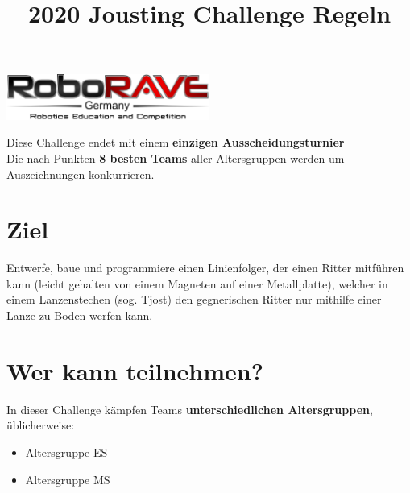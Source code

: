 \documentclass[a4paper,12pt]{article}
\begin{document}
\title{2020 Jousting Challenge Regeln}
\makeatletter
\let\inserttitle\@title
\makeatother
\begin{center}
\includegraphics[width=0.5\textwidth]{logo.png}

\huge                      %
\bfseries                   %
\inserttitle
\end{center}
\begin{center}
Diese Challenge endet mit einem \textbf{einzigen Ausscheidungsturnier}
\\
Die nach Punkten \textbf{8 besten Teams} aller Altersgruppen werden um
Auszeichnungen konkurrieren.
\end{center}
\section{Ziel}
Entwerfe, baue und programmiere einen Linienfolger, der einen Ritter mitführen
kann (leicht gehalten von einem Magneten auf einer Metallplatte), welcher in
einem Lanzenstechen (sog. Tjost) den gegnerischen Ritter nur mithilfe einer
Lanze zu Boden werfen kann.
\section{Wer kann teilnehmen?}
In dieser Challenge kämpfen Teams \textbf{unterschiedlichen Altersgruppen},
üblicherweise:
\begin{itemize}
	\item Altersgruppe ES
	\item Altersgruppe MS
\end{itemize}
\end{document}
